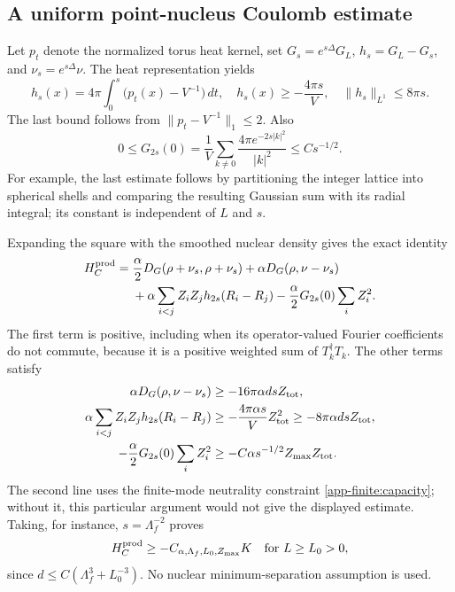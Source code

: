 \subsection{A uniform point-nucleus Coulomb estimate}
\label{app-finite:coulomb}

Let $p_t$ denote the normalized torus heat kernel, set
$G_s=e^{s\Delta}G_L$, $h_s=G_L-G_s$, and
$\nu_s=e^{s\Delta}\nu$.  The heat representation yields
\[
 h_s(x)=4\pi\int_0^s\bigl(p_t(x)-V^{-1}\bigr)\,dt,
 \quad h_s(x)\ge-\frac{4\pi s}{V},
 \quad \|h_s\|_{L^1}\le8\pi s.
\]
The last bound follows from $\|p_t-V^{-1}\|_1\le2$.  Also
\begin{equation}
 0\le G_{2s}(0)
 =\frac1V\sum_{k\ne0}\frac{4\pi e^{-2s|k|^2}}{|k|^2}
 \le C s^{-1/2}.
 \label{app-finite:heat-self}
\end{equation}
For example, the last estimate follows by partitioning the integer lattice
into spherical shells and comparing the resulting Gaussian sum with its
radial integral; its constant is independent of $L$ and $s$.

Expanding the square with the smoothed nuclear density gives the exact
identity
\begin{align}
 H_C^{\rm prod}
 ={}&\frac\alpha2D_G(\rho+\nu_s,\rho+\nu_s)
       +\alpha D_G(\rho,\nu-\nu_s)\nonumber\\
 &+\alpha\sum_{i<j}Z_iZ_jh_{2s}(R_i-R_j)
       -\frac\alpha2G_{2s}(0)\sum_iZ_i^2.
 \label{app-finite:heat-identity}
\end{align}
The first term is positive, including when its operator-valued Fourier
coefficients do not commute, because it is a positive weighted sum of
$T_k^\dagger T_k$.  The other terms satisfy
\begin{align*}
 \alpha D_G(\rho,\nu-\nu_s)
   &\ge-16\pi\alpha d s Z_{\rm tot},\\
 \alpha\sum_{i<j}Z_iZ_jh_{2s}(R_i-R_j)
   &\ge-\frac{4\pi\alpha s}{V}Z_{\rm tot}^2
    \ge-8\pi\alpha d s Z_{\rm tot},\\
 -\frac\alpha2G_{2s}(0)\sum_iZ_i^2
   &\ge-C\alpha s^{-1/2}Z_{\max}Z_{\rm tot}.
\end{align*}
The second line uses the finite-mode neutrality constraint
\eqref{app-finite:capacity}; without it, this particular argument would not
give the displayed estimate.  Taking, for instance, $s=\Lambda_f^{-2}$ proves
\begin{equation}
 H_C^{\rm prod}\ge-C_{\alpha,\Lambda_f,L_0,Z_{\max}}K
 \quad\hbox{for }L\ge L_0>0,
 \label{app-finite:coulomb-bound}
\end{equation}
since $d\le C(\Lambda_f^3+L_0^{-3})$.  No nuclear minimum-separation
assumption is used.

